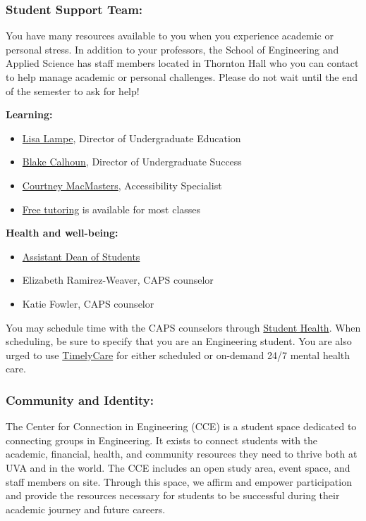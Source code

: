 \documentclass[11pt, a4paper]{article}
\begin{document}
\subsubsection*{Student Support Team:}
You have many resources available to you when you experience academic or personal stress. In addition to your professors, the School of Engineering and Applied Science has staff members located in Thornton Hall who you can contact to help manage academic or personal challenges. Please do not wait until the end of the semester to ask for help!

\textbf{Learning:}
\begin{itemize}
    \item \href{mailto:ll4uu@virginia.edu}{Lisa Lampe}, Director of Undergraduate Education
    \item \href{mailto:bic4sc@virginia.edu}{Blake Calhoun}, Director of Undergraduate Success
    \item \href{mailto:cmacmasters@virginia.edu}{Courtney MacMasters}, Accessibility Specialist
    \item \href{https://engineering.virginia.edu/current-students/current-undergraduate-students/student-support/tutoring}{Free tutoring} is available for most classes
\end{itemize}

\textbf{Health and well-being:}
\begin{itemize}
    \item \href{https://engineering.virginia.edu/about/offices/office-graduate-programs/student-support-services#accordion716460}{Assistant Dean of Students}
    \item Elizabeth Ramirez-Weaver, CAPS counselor
    \item Katie Fowler, CAPS counselor
\end{itemize}
You may schedule time with the CAPS counselors through \href{https://www.studenthealth.virginia.edu/getting-started-caps}{Student Health}. When scheduling, be sure to specify that you are an Engineering student. You are also urged to use \href{https://www.studenthealth.virginia.edu/timelycare}{TimelyCare} for either scheduled or on-demand 24/7 mental health care.

\subsubsection*{Community and Identity:}
The Center for Connection in Engineering (CCE) is a student space dedicated to connecting groups in Engineering. It exists to connect students with the academic, financial, health, and community resources they need to thrive both at UVA and in the world. The CCE includes an open study area, event space, and staff members on site. Through this space, we affirm and empower participation and provide the resources necessary for students to be successful during their academic journey and future careers.
\end{document}
